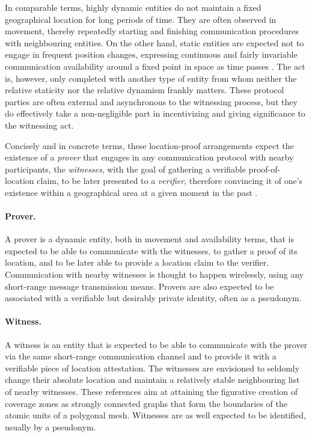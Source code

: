 In comparable terms, highly dynamic entities do not maintain a fixed geographical location for long periods of time. They are often observed in movement, thereby repeatedly starting and finishing communication procedures with neighbouring entities. On the other hand, static entities are expected not to engage in frequent position changes, expressing continuous and fairly invariable communication availability around a fixed point in space as time passes \cite{nasrulin2018robust}. The act is, however, only completed with another type of entity from whom neither the relative staticity nor the relative dynamism frankly matters. These protocol parties are often external and asynchronous to the witnessing process, but they do effectively take a non-negligible part in incentivizing and giving significance to the witnessing act. 

Concisely and in concrete terms, these location-proof arrangements expect the existence of a \emph{prover} that engages in any communication protocol with nearby participants, the \emph{witnesses}, with the goal of gathering a verifiable proof-of-location claim, to be later presented to a \emph{verifier}, therefore convincing it of one's existence within a geographical area at a given moment in the past \cite{dupin2018location}.

\paragraph{Prover.} A prover is a dynamic entity, both in movement and availability terms, that is expected to be able to communicate with the witnesses, to gather a proof of its location, and to be later able to provide a location claim to the verifier. Communication with nearby witnesses is thought to happen wirelessly, using any short-range message transmission means. Provers are also expected to be associated with a verifiable but desirably private identity, often as a pseudonym.

\paragraph{Witness.} A witness is an entity that is expected to be able to communicate with the prover via the same short-range communication channel and to provide it with a verifiable piece of location attestation. The witnesses are envisioned to seldomly change their absolute location and maintain a relatively stable neighbouring list of nearby witnesses. These references aim at attaining the figurative creation of coverage zones as strongly connected graphs that form the boundaries of the atomic units of a polygonal mesh. Witnesses are as well expected to be identified, usually by a pseudonym.

